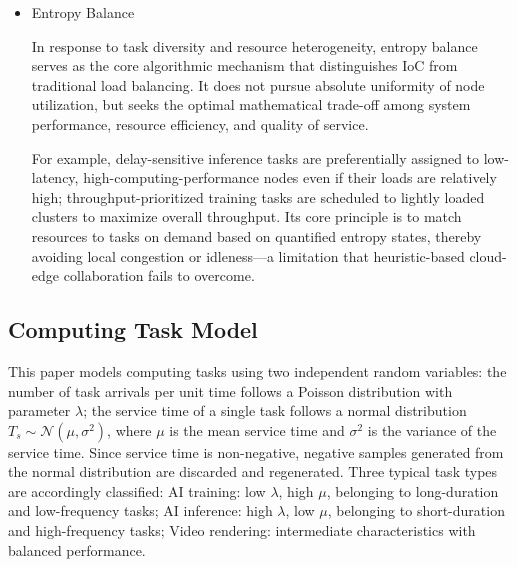 \documentclass{ccjnl}
\begin{document}
\begin{itemize}[nosep]
	Faced with the fragmentation of heterogeneous resources (CPU, GPU, TPU, etc.) caused by geographical and architectural differences, resource pooling abstracts distributed resources into feature vectors of computing, storage, and networking through unified identification. Unlike traditional distributed computing abstractions, IoC characterizes their dynamic states with the aforementioned entropy values, achieving unified management and reuse under a global logical view.
	\item Entropy Balance
	
	
	In response to task diversity and resource heterogeneity, entropy balance serves as the core algorithmic mechanism that distinguishes IoC from traditional load balancing. It does not pursue absolute uniformity of node utilization, but seeks the optimal mathematical trade-off among system performance, resource efficiency, and quality of service.
	
	For example, delay-sensitive inference tasks are preferentially assigned to low-latency, high-computing-performance nodes even if their loads are relatively high; throughput-prioritized training tasks are scheduled to lightly loaded clusters to maximize overall throughput. Its core principle is to match resources to tasks on demand based on quantified entropy states, thereby avoiding local congestion or idleness—a limitation that heuristic-based cloud-edge collaboration fails to overcome.
\end{itemize}

\subsection{Computing Task Model}
\label{s3-3}
This paper models computing tasks using two independent random variables: the number of task arrivals per unit time follows a Poisson distribution with parameter $\lambda$; the service time of a single task follows a normal distribution $T_s\sim\mathcal{N}(\mu,\sigma^2)$, where $\mu$ is the mean service time and $\sigma^2$ is the variance of the service time. Since service time is non-negative, negative samples generated from the normal distribution are discarded and regenerated. Three typical task types are accordingly classified: AI training: low $\lambda$, high $\mu$, belonging to long-duration and low-frequency tasks; AI inference: high $\lambda$, low $\mu$, belonging to short-duration and high-frequency tasks; Video rendering: intermediate characteristics with balanced performance.
\end{document}
